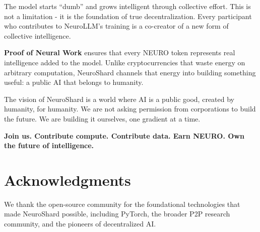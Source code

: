 \documentclass[11pt,a4paper]{article}
\begin{document}
The model starts ``dumb'' and grows intelligent through collective effort. This is not a limitation - it is the foundation of true decentralization. Every participant who contributes to NeuroLLM's training is a co-creator of a new form of collective intelligence.

\textbf{Proof of Neural Work} ensures that every NEURO token represents real intelligence added to the model. Unlike cryptocurrencies that waste energy on arbitrary computation, NeuroShard channels that energy into building something useful: a public AI that belongs to humanity.

The vision of NeuroShard is a world where AI is a public good, created by humanity, for humanity. We are not asking permission from corporations to build the future. We are building it ourselves, one gradient at a time.

\textbf{Join us. Contribute compute. Contribute data. Earn NEURO. Own the future of intelligence.}

\section{Acknowledgments}

We thank the open-source community for the foundational technologies that made NeuroShard possible, including PyTorch, the broader P2P research community, and the pioneers of decentralized AI.
\end{document}
